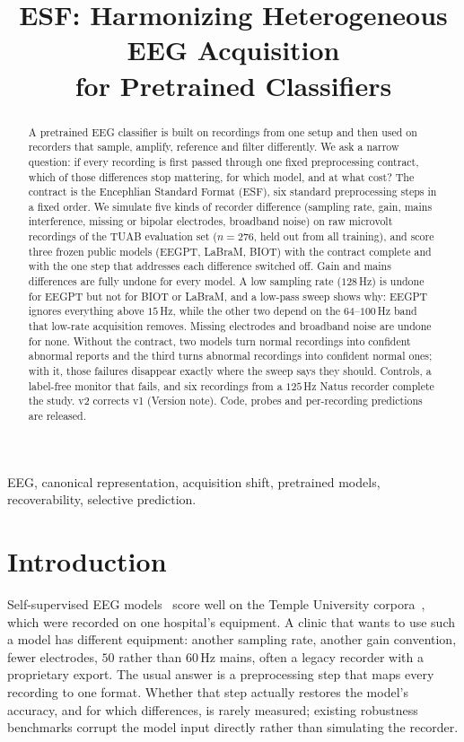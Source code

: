 \documentclass[conference]{IEEEtran}
\title{ESF: Harmonizing Heterogeneous EEG Acquisition\\for Pretrained Classifiers}
\author{\IEEEauthorblockN{Hitesh Dammu}
\IEEEauthorblockA{Independent Researcher, Hyderabad, India \\
hdammu@asu.edu}}
\begin{document}
\maketitle

\begin{abstract}
A pretrained EEG classifier is built on recordings from one setup and
then used on recorders that sample, amplify, reference and filter
differently. We ask a narrow question: if every recording is first
passed through one fixed preprocessing contract, which of those
differences stop mattering, for which model, and at what cost? The
contract is the Encephlian Standard Format (ESF), six standard
preprocessing steps in a fixed order. We simulate five kinds of
recorder difference (sampling rate, gain, mains interference, missing
or bipolar electrodes, broadband noise) on raw microvolt recordings of
the TUAB evaluation set ($n{=}276$, held out from all training), and
score three frozen public models (EEGPT, LaBraM, BIOT) with the
contract complete and with the one step that addresses each
difference switched off. Gain and mains differences are fully undone
for every model. A low sampling rate ($128$\,Hz) is undone for EEGPT
but not for BIOT or LaBraM, and a low-pass sweep shows why: EEGPT
ignores everything above $15$\,Hz, while the other two depend on the
$64$--$100$\,Hz band that low-rate acquisition removes. Missing
electrodes and broadband noise are undone for none. Without the
contract, two models turn normal recordings into confident abnormal
reports and the third turns abnormal recordings into confident normal
ones; with it, those failures disappear exactly where the sweep says
they should. Controls, a label-free monitor that fails, and six
recordings from a $125$\,Hz Natus recorder complete the study. v2
corrects v1 (Version note). Code, probes and per-recording
predictions are released.
\end{abstract}

\begin{IEEEkeywords}
EEG, canonical representation, acquisition shift, pretrained models,
recoverability, selective prediction.
\end{IEEEkeywords}

\IEEEpeerreviewmaketitle

\section{Introduction}
\label{sec:intro}
Self-supervised EEG models~\cite{wang2024eegpt,jiang2024labram,yang2023biot}
score well on the Temple University corpora~\cite{obeid2016tuh,lopez2015abnormal},
which were recorded on one hospital's equipment. A clinic that wants to
use such a model has different equipment: another sampling rate,
another gain convention, fewer electrodes, $50$ rather than $60$\,Hz
mains, often a legacy recorder with a proprietary export. The usual
answer is a preprocessing step that maps every recording to one
format. Whether that step actually restores the model's accuracy, and
for which differences, is rarely measured; existing robustness
benchmarks corrupt the model input directly rather than simulating
the recorder.
\end{document}
